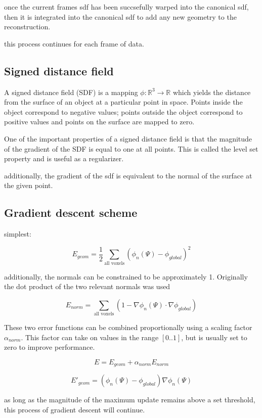 \documentclass[12pt,twoside]{report}
\begin{document}
once the current frames sdf has been succsefully warped into the canonical sdf, then it is integrated into the canonical sdf to add any new geometry to the reconstruction.

this process continues for each frame of data.

\subsection{Signed distance field}

A signed distance field (SDF) is a mapping $\phi : \mathbb{R}^3 \rightarrow  \mathbb{R}$ which yields the distance from the surface of an object at a particular point in space. 
Points inside the object correspond to negative values; points outside the object correspond to positive values and points on the surface are mapped to zero.

One of the important properties of a signed distance field is that the magnitude of the gradient of the SDF is equal to one at all points. This is called the level set property and is useful as a regularizer.

additionally, the gradient of the sdf is equivalent to the normal of the surface at the given point.


\subsection{Gradient descent scheme}



simplest:

$$ E_{geom} = \frac{1}{2} \sum\limits_{\textrm{all voxels}} (\phi_n(\Psi) - \phi_{global})^2  $$


additionally, the normals can be constrained to be approximately 1. Originally the dot product of the two relevant normals was used

$$ E_{norm} = \sum\limits_{\textrm{all voxels}}(1 - \nabla \phi_n(\Psi) \cdot \nabla\phi_{global}) $$

These two error functions can be combined proportionally using a scaling factor $\alpha_{norm}$. This factor can take on values in the range $[0..1]$, but is usually set to zero to improve performance.

$$E = E_{geom} + \alpha_{norm}E_{norm}$$

$$ E'_{geom} = (\phi_n(\Psi) - \phi_{global}) \nabla \phi_n(\Psi)$$

as long as the magnitude of the maximum update remains above a set threshold, this process of gradient descent will continue.
\end{document}
